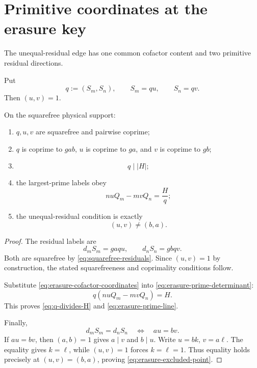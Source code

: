 \section{Primitive coordinates at the erasure key}
\label{sec:erasure-coordinates}

The unequal-residual edge has one common cofactor content and two
primitive residual directions.

\begin{definition}
\label{def:primitive-erasure-coordinates}
Put
\begin{equation}
 q:=(S_m,S_n),\qquad
 S_m=qu,\qquad S_n=qv.
 \label{eq:erasure-cofactor-coordinates}
\end{equation}
Then \((u,v)=1\).
\end{definition}

\begin{theorem}
\label{thm:erasure-divisor-line}
On the squarefree physical support:
\begin{enumerate}[label=\textup{(\roman*)},leftmargin=3em]
 \item \(q,u,v\) are squarefree and pairwise coprime;
 \item \(q\) is coprime to \(gab\), \(u\) is coprime to \(ga\), and \(v\)
       is coprime to \(gb\);
 \item
       \begin{equation}
       \boxed{q\mid |H|;}
       \label{eq:q-divides-H}
       \end{equation}
 \item the largest-prime labels obey
       \begin{equation}
       \boxed{nuQ_m-mvQ_n=\frac{H}{q};}
       \label{eq:erasure-prime-line}
       \end{equation}
 \item the unequal-residual condition is exactly
       \begin{equation}
       \boxed{(u,v)\ne(b,a).}
       \label{eq:erasure-excluded-point}
       \end{equation}
\end{enumerate}
\end{theorem}

\begin{proof}
The residual labels are
\[
 d_mS_m=gaqu,\qquad d_nS_n=gbqv.
\]
Both are squarefree by \eqref{eq:squarefree-residuals}.  Since
\((u,v)=1\) by construction, the stated squarefreeness and coprimality
conditions follow.

Substitute \eqref{eq:erasure-cofactor-coordinates} into
\eqref{eq:erasure-prime-determinant}:
\[
 q(nuQ_m-mvQ_n)=H.
\]
This proves \eqref{eq:q-divides-H} and
\eqref{eq:erasure-prime-line}.

Finally,
\[
 d_mS_m=d_nS_n
 \quad\Longleftrightarrow\quad
 au=bv.
\]
If \(au=bv\), then \((a,b)=1\) gives \(a\mid v\) and \(b\mid u\).
Write \(u=bk\), \(v=a\ell\).  The equality gives \(k=\ell\), while
\((u,v)=1\) forces \(k=\ell=1\).  Thus equality holds precisely at
\((u,v)=(b,a)\), proving \eqref{eq:erasure-excluded-point}.
\end{proof}

